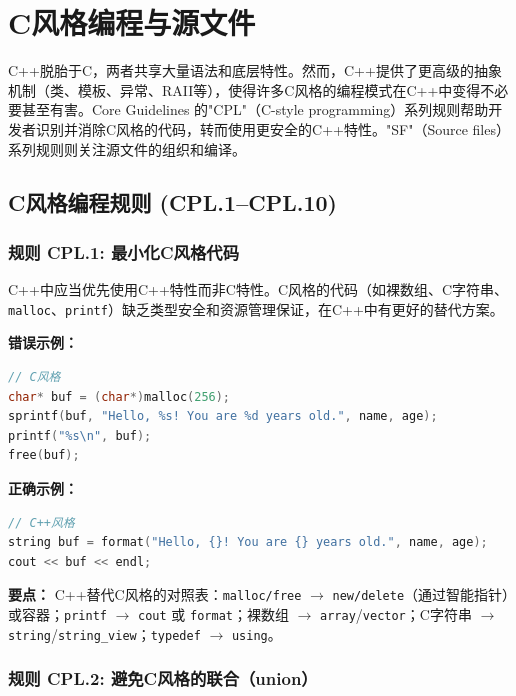 
\chapter{C风格编程与源文件}

C++脱胎于C，两者共享大量语法和底层特性。然而，C++提供了更高级的抽象机制（类、模板、异常、RAII等），使得许多C风格的编程模式在C++中变得不必要甚至有害。Core Guidelines 的"CPL"（C-style programming）系列规则帮助开发者识别并消除C风格的代码，转而使用更安全的C++特性。"SF"（Source files）系列规则则关注源文件的组织和编译。

\section{C风格编程规则 (CPL.1--CPL.10)}

\subsection*{\textbf{规则 CPL.1:} 最小化C风格代码}

C++中应当优先使用C++特性而非C特性。C风格的代码（如裸数组、C字符串、\texttt{malloc}、\texttt{printf}）缺乏类型安全和资源管理保证，在C++中有更好的替代方案。

\textbf{错误示例：}

\begin{lstlisting}[language=C++]
// C风格
char* buf = (char*)malloc(256);
sprintf(buf, "Hello, %s! You are %d years old.", name, age);
printf("%s\n", buf);
free(buf);
\end{lstlisting}

\textbf{正确示例：}

\begin{lstlisting}[language=C++]
// C++风格
string buf = format("Hello, {}! You are {} years old.", name, age);
cout << buf << endl;
\end{lstlisting}

\textbf{要点：} C++替代C风格的对照表：\texttt{malloc/free} $\rightarrow$ \texttt{new/delete}（通过智能指针）或容器；\texttt{printf} $\rightarrow$ \texttt{cout} 或 \texttt{format}；裸数组 $\rightarrow$ \texttt{array}/\allowbreak{}\texttt{vector}；C字符串 $\rightarrow$ \texttt{string}/\allowbreak{}\texttt{string\_view}；\texttt{typedef} $\rightarrow$ \texttt{using}。

\subsection*{\textbf{规则 CPL.2:} 避免C风格的联合（union）}

